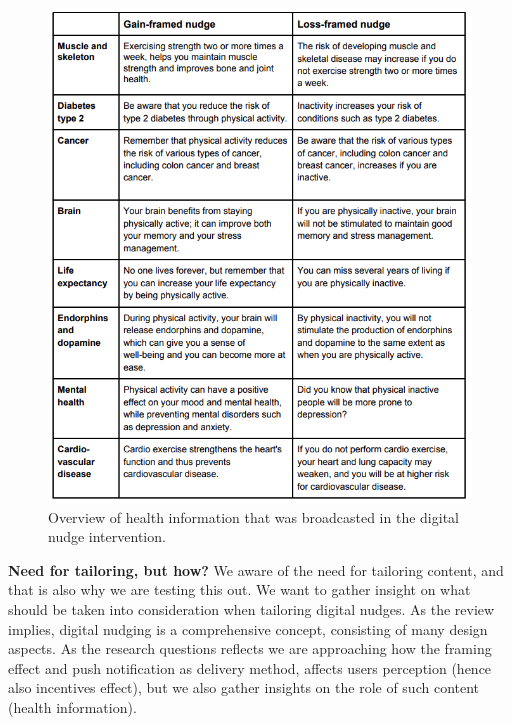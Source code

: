 \begin{figure}
    \includegraphics[width=1\textwidth]{images/Nudger.png}
    \caption{Overview of health information that was broadcasted in the digital nudge intervention.}\label{fig:my_label} 
\end{figure}

\textbf{Need for tailoring, but how?}
We aware of the need for tailoring content, and that is also why we are testing this out. We want to gather insight on what should be taken into consideration when tailoring digital nudges. As the review implies, digital nudging is a comprehensive concept, consisting of many design aspects. As the research questions reflects we are approaching how the framing effect and push notification as delivery method, affects users perception (hence also incentives effect), but we also gather insights on the role of such content (health information).  


